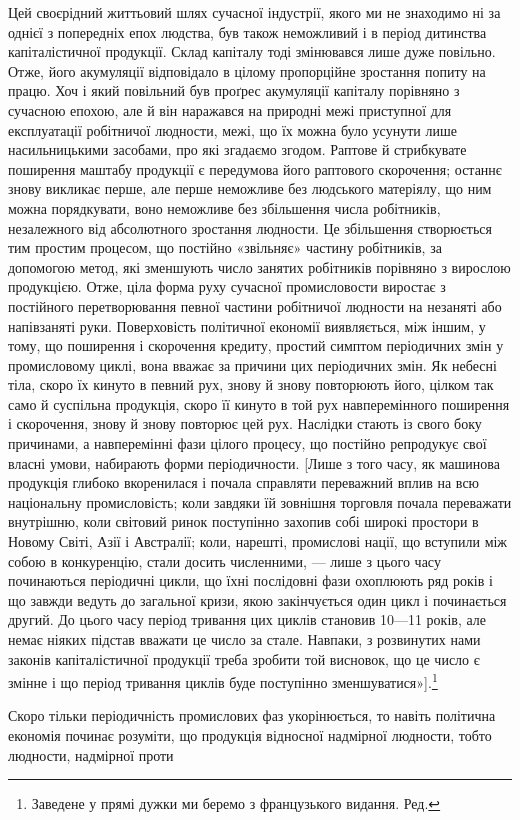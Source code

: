 Цей своєрідний життьовий шлях сучасної індустрії, якого ми не
знаходимо ні за однієї з попередніх епох людства, був також
неможливий і в період дитинства капіталістичної продукції. Склад
капіталу тоді змінювався лише дуже повільно. Отже, його акумуляції
відповідало в цілому пропорційне зростання попиту на
працю. Хоч і який повільний був проґрес акумуляції капіталу
порівняно з сучасною епохою, але й він наражався на природні
межі приступної для експлуатації робітничої людности, межі, що
їх можна було усунути лише насильницькими засобами, про які
згадаємо згодом. Раптове й стрибкувате поширення маштабу
продукції є передумова його раптового скорочення; останнє
знову викликає перше, але перше неможливе без людського
матеріялу, що ним можна порядкувати, воно неможливе без
збільшення числа робітників, незалежного від абсолютного зростання
людности. Це збільшення створюється тим простим процесом,
що постійно «звільняє» частину робітників, за допомогою
метод, які зменшують число занятих робітників порівняно з
вирослою продукцією. Отже, ціла форма руху сучасної промисловости
виростає з постійного перетворювання певної частини
робітничої людности на незаняті або напівзаняті руки. Поверховість
політичної економії виявляється, між іншим, у тому, що
поширення і скорочення кредиту, простий симптом періодичних
змін у промисловому циклі, вона вважає за причини цих періодичних
змін. Як небесні тіла, скоро їх кинуто в певний рух,
знову й знову повторюють його, цілком так само й суспільна
продукція, скоро її кинуто в той рух навперемінного поширення
і скорочення, знову й знову повторює цей рух. Наслідки стають
із свого боку причинами, а навперемінні фази цілого процесу,
що постійно репродукує свої власні умови, набирають форми періодичности.
[Лише з того часу, як машинова продукція глибоко
вкоренилася і почала справляти переважний вплив на всю національну
промисловість; коли завдяки їй зовнішня торговля
почала переважати внутрішню, коли світовий ринок поступінно
захопив собі широкі простори в Новому Світі, Азії і Австралії;
коли, нарешті, промислові нації, що вступили між собою в конкуренцію,
стали досить численними, — лише з цього часу починаються
періодичні цикли, що їхні послідовні фази охоплюють
ряд років і що завжди ведуть до загальної кризи, якою закінчується
один цикл і починається другий. До цього часу період
тривання цих циклів становив 10—11 років, але немає ніяких
підстав вважати це число за стале. Навпаки, з розвинутих нами
законів капіталістичної продукції треба зробити той висновок,
що це число є змінне і що період тривання циклів буде поступінно
зменшуватися»].\footnote*{
Заведене у прямі дужки ми беремо з французького видання. Ред.
}

Скоро тільки періодичність промислових фаз укорінюється,
то навіть політична економія починає розуміти, що продукція
відносної надмірної людности, тобто людности, надмірної проти
\parbreak{}  %
